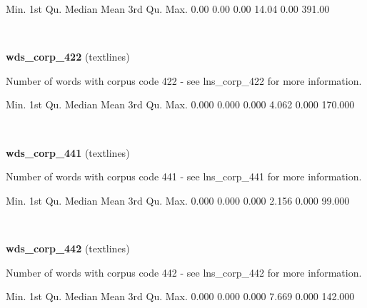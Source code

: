 \documentclass[]{article}
\newenvironment{Shaded}{\begin{snugshade}}{\end{snugshade}}
\newcommand{\FloatTok}[1]{\textcolor[rgb]{0.00,0.00,0.81}{{#1}}}
\newcommand{\NormalTok}[1]{{#1}}
\begin{document}
\begin{Shaded}
\begin{Highlighting}[]
   \NormalTok{Min. 1st Qu.  Median    Mean 3rd Qu.    Max. }
   \FloatTok{0.00}    \FloatTok{0.00}    \FloatTok{0.00}   \FloatTok{14.04}    \FloatTok{0.00}  \FloatTok{391.00} 
\end{Highlighting}
\end{Shaded}

~

\vspace{1em}

\textbf{wds\_corp\_422} (textlines)

Number of words with corpus code 422 - see lns\_corp\_422 for more
information.

\begin{Shaded}
\begin{Highlighting}[]
   \NormalTok{Min. 1st Qu.  Median    Mean 3rd Qu.    Max. }
  \FloatTok{0.000}   \FloatTok{0.000}   \FloatTok{0.000}   \FloatTok{4.062}   \FloatTok{0.000} \FloatTok{170.000} 
\end{Highlighting}
\end{Shaded}

~

\vspace{1em}

\textbf{wds\_corp\_441} (textlines)

Number of words with corpus code 441 - see lns\_corp\_441 for more
information.

\begin{Shaded}
\begin{Highlighting}[]
   \NormalTok{Min. 1st Qu.  Median    Mean 3rd Qu.    Max. }
  \FloatTok{0.000}   \FloatTok{0.000}   \FloatTok{0.000}   \FloatTok{2.156}   \FloatTok{0.000}  \FloatTok{99.000} 
\end{Highlighting}
\end{Shaded}

~

\vspace{1em}

\textbf{wds\_corp\_442} (textlines)

Number of words with corpus code 442 - see lns\_corp\_442 for more
information.

\begin{Shaded}
\begin{Highlighting}[]
   \NormalTok{Min. 1st Qu.  Median    Mean 3rd Qu.    Max. }
  \FloatTok{0.000}   \FloatTok{0.000}   \FloatTok{0.000}   \FloatTok{7.669}   \FloatTok{0.000} \FloatTok{142.000} 
\end{Highlighting}
\end{Shaded}
\end{document}
